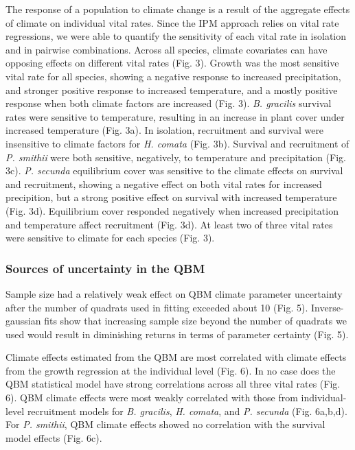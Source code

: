 \documentclass[12pt,]{article}
\begin{document}
The response of a population to climate change is a result of the
aggregate effects of climate on individual vital rates. Since the IPM
approach relies on vital rate regressions, we were able to quantify the
sensitivity of each vital rate in isolation and in pairwise
combinations. Across all species, climate covariates can have opposing
effects on different vital rates (Fig. 3). Growth was the most sensitive
vital rate for all species, showing a negative response to increased
precipitation, and stronger positive response to increased temperature,
and a mostly positive response when both climate factors are increased
(Fig. 3). \emph{B. gracilis} survival rates were sensitive to
temperature, resulting in an increase in plant cover under increased
temperature (Fig. 3a). In isolation, recruitment and survival were
insensitive to climate factors for \emph{H. comata} (Fig. 3b). Survival
and recruitment of \emph{P. smithii} were both sensitive, negatively, to
temperature and precipitation (Fig. 3c). \emph{P. secunda} equilibrium
cover was sensitive to the climate effects on survival and recruitment,
showing a negative effect on both vital rates for increased precipition,
but a strong positive effect on survival with increased temperature
(Fig. 3d). Equilibrium cover responded negatively when increased
precipitation and temperature affect recruitment (Fig. 3d). At least two
of three vital rates were sensitive to climate for each species (Fig.
3).

\subsubsection{Sources of uncertainty in the
QBM}\label{sources-of-uncertainty-in-the-qbm}

Sample size had a relatively weak effect on QBM climate parameter
uncertainty after the number of quadrats used in fitting exceeded about
10 (Fig. 5). Inverse-gaussian fits show that increasing sample size
beyond the number of quadrats we used would result in diminishing
returns in terms of parameter certainty (Fig. 5).

Climate effects estimated from the QBM are most correlated with climate
effects from the growth regression at the individual level (Fig. 6). In
no case does the QBM statistical model have strong correlations across
all three vital rates (Fig. 6). QBM climate effects were most weakly
correlated with those from individual-level recruitment models for
\emph{B. gracilis}, \emph{H. comata}, and \emph{P. secunda} (Fig.
6a,b,d). For \emph{P. smithii}, QBM climate effects showed no
correlation with the survival model effects (Fig. 6c).
\end{document}
